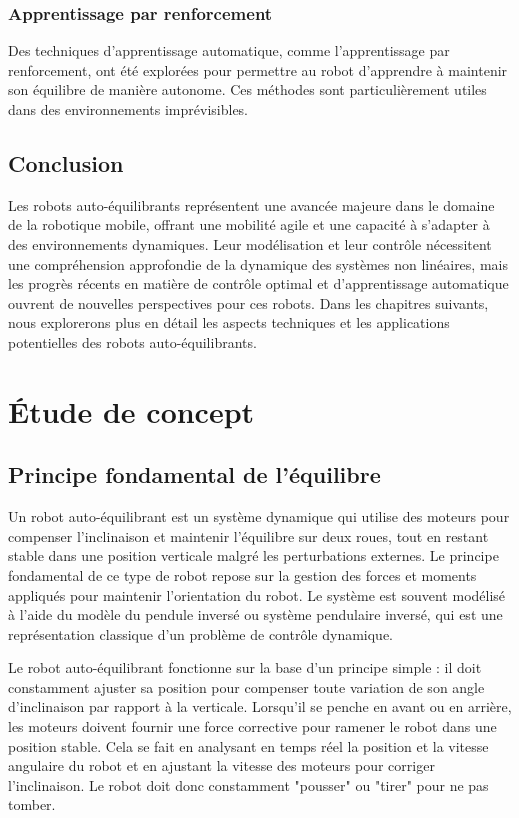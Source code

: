 \documentclass{report}
\begin{document}
\subsection*{Apprentissage par renforcement}
Des techniques d'apprentissage automatique, comme l'apprentissage par renforcement, ont été explorées pour permettre au robot d'apprendre à maintenir son équilibre de manière autonome. Ces méthodes sont particulièrement utiles dans des environnements imprévisibles.

\section*{ Conclusion}

Les robots auto-équilibrants représentent une avancée majeure dans le domaine de la robotique mobile, offrant une mobilité agile et une capacité à s'adapter à des environnements dynamiques. Leur modélisation et leur contrôle nécessitent une compréhension approfondie de la dynamique des systèmes non linéaires, mais les progrès récents en matière de contrôle optimal et d'apprentissage automatique ouvrent de nouvelles perspectives pour ces robots. Dans les chapitres suivants, nous explorerons plus en détail les aspects techniques et les applications potentielles des robots auto-équilibrants.

\chapter{Étude de concept}

\section{Principe fondamental de l'équilibre}

Un robot auto-équilibrant est un système dynamique qui utilise des moteurs pour compenser l'inclinaison et maintenir l'équilibre sur deux roues, tout en restant stable dans une position verticale malgré les perturbations externes. Le principe fondamental de ce type de robot repose sur la gestion des forces et moments appliqués pour maintenir l'orientation du robot. Le système est souvent modélisé à l'aide du modèle du pendule inversé ou système pendulaire inversé, qui est une représentation classique d'un problème de contrôle dynamique.

Le robot auto-équilibrant fonctionne sur la base d'un principe simple : il doit constamment ajuster sa position pour compenser toute variation de son angle d'inclinaison par rapport à la verticale. Lorsqu'il se penche en avant ou en arrière, les moteurs doivent fournir une force corrective pour ramener le robot dans une position stable. Cela se fait en analysant en temps réel la position et la vitesse angulaire du robot et en ajustant la vitesse des moteurs pour corriger l'inclinaison. Le robot doit donc constamment "pousser" ou "tirer" pour ne pas tomber.
\end{document}

